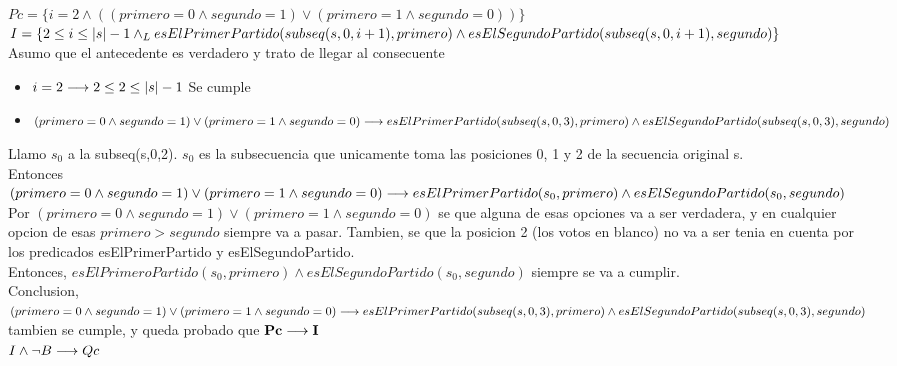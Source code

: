 \documentclass[10pt,a4paper]{article}
\begin{document}
\begin{enumerate}
$Pc = \{i = 2 \land ((primero = 0 \land segundo = 1) \lor (primero = 1 \land segundo = 0))\}$
\vspace{0.3cm}
\\
$I = \{ 2\leq i \leq|s|-1 \land _L esElPrimerPartido(subseq(s, 0, i+1), primero) \land esElSegundoPartido(subseq(s, 0, i+1), segundo)\}$
\vspace{0.3cm}
\\
Asumo que el antecedente es verdadero y trato de llegar al consecuente
\vspace{0.3cm}
\\
\begin{itemize}
    \item $i = 2 \longrightarrow 2\leq 2\leq |s|-1$ Se cumple
    \item $(primero = 0 \land segundo = 1) \lor (primero = 1 \land segundo = 0)\longrightarrow esElPrimerPartido(subseq(s, 0, 3), primero) \land esElSegundoPartido(subseq(s, 0, 3), segundo)$
\end{itemize}
Llamo $s_0$ a la subseq(s,0,2). $s_0$ es la subsecuencia que unicamente toma las posiciones 0, 1 y 2 de la secuencia original s.
\\
Entonces
\vspace{0.3cm}
\\
$(primero = 0 \land segundo = 1) \lor (primero = 1 \land segundo = 0)\longrightarrow 
\\
esElPrimerPartido(s_0, primero) \land esElSegundoPartido(s_0, segundo)$
\vspace{0.3cm}
\\
Por $(primero = 0 \land segundo = 1) \lor (primero = 1 \land segundo = 0)$ se que alguna de esas opciones va a ser verdadera, y en cualquier opcion de esas $primero > segundo$ siempre va a pasar. Tambien, se que la posicion 2 (los votos en blanco) no va a ser tenia en cuenta por los predicados esElPrimerPartido y esElSegundoPartido.
\vspace{0.3cm}
\\
Entonces, $esElPrimeroPartido(s_0, primero) \land esElSegundoPartido(s_0, segundo)$ siempre se va a cumplir.
\vspace{0.3cm}
\\
Conclusion, $(primero = 0 \land segundo = 1) \lor (primero = 1 \land segundo = 0)\longrightarrow esElPrimerPartido(subseq(s, 0, 3), primero) \land esElSegundoPartido(subseq(s, 0, 3), segundo)$ tambien se cumple, y queda probado que $\textbf{Pc} \longrightarrow \textbf{I}$
\vspace{0.3cm}
\\
\underline{\textbf{$I \land \neg B \longrightarrow Qc$}}

\end{enumerate}
\end{document}
